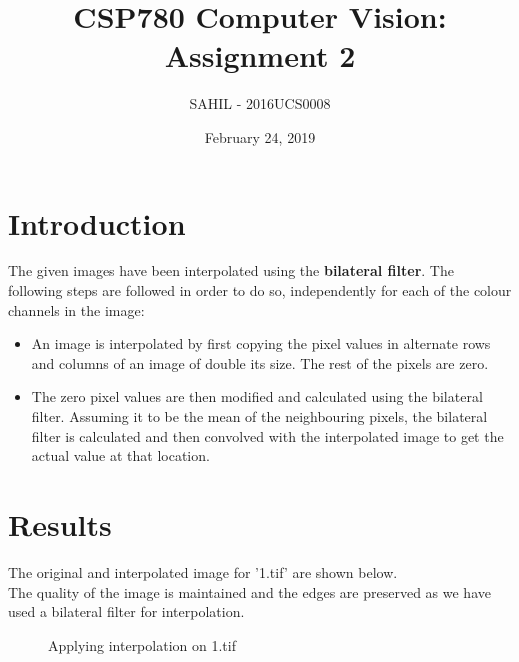 \documentclass{article}
\title{CSP780 Computer Vision: Assignment 2}
\author{SAHIL - 2016UCS0008}
\date{February 24, 2019}
\begin{document}
\maketitle

\section{Introduction}
\large
The given images have been interpolated using the \textbf{bilateral filter}. The following steps are followed in order to do so, independently for each of the colour channels in the image:
\begin{itemize}
    \item An image is interpolated by first copying the pixel values in alternate rows and columns of an image of double its size. The rest of the pixels are zero. 
    \item The zero pixel values are then modified and calculated using the bilateral filter. Assuming it to be the mean of the neighbouring pixels, the bilateral filter is calculated and then convolved with the interpolated image to get the actual value at that location. 
\end{itemize}

\section{Results}

	The original and interpolated image for '1.tif' are shown below. \\
	The quality of the image is maintained and the edges are preserved as we have used a bilateral filter for interpolation. 
	
	\begin{figure}[H]
		\centering
		\qquad
		\caption{Applying interpolation on 1.tif}
	\end{figure}
	
\end{document}
